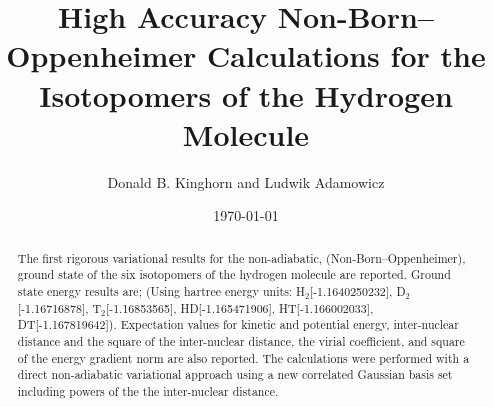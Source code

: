

\linespread{1.6}



\draft

\title{High Accuracy Non-Born--Oppenheimer Calculations for the
        Isotopomers of the Hydrogen Molecule  }
\author{Donald B. Kinghorn and Ludwik Adamowicz}
\address{ Department of Chemistry\\
        University of Arizona\\
        Tucson AZ 85721}
\date{\today}
\maketitle

\begin{abstract}
  The first rigorous variational results for the non-adiabatic,
  (Non-Born--Oppenheimer), ground state of the six isotopomers of the
  hydrogen molecule are reported.  Ground state energy results are;
  (Using hartree energy units: H$_2$[-1.1640250232],
  D$_2$[-1.16716878], T$_2$[-1.16853565], HD[-1.165471906],
  HT[-1.166002033], DT[-1.167819642]).  Expectation values for kinetic
  and potential energy, inter-nuclear distance and the square of the
  inter-nuclear distance, the virial coefficient, and square of the
  energy gradient norm are also reported.  The calculations were
  performed with a direct non-adiabatic variational approach using a
  new correlated {G}aussian basis set including powers of the the
  inter-nuclear distance.
\end{abstract}



